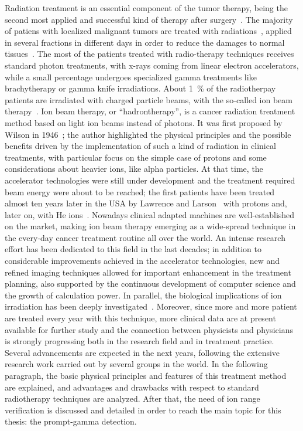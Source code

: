 Radiation treatment is an essential component of the tumor therapy, being the second most applied and successful kind of therapy after surgery~\parencite{Schardt2010}. The majority of patiens with localized malignant tumors are treated with radiations~\parencite{Durante2009, Baskar2012, Moding2013}, applied in several fractions in different days in order to reduce the damages to normal tissues~\parencite{Bentzen2006}. The most of the patients treated with radio-therapy techniques receives standard photon treatments, with x-rays coming from linear electron accelerators, while a small percentage undergoes specialized gamma treatments like brachytherapy or gamma knife irradiations. About 1~\% of the radiotherpay patients are irradiated with charged particle beams, with the so-called ion beam therapy~\parencite{Durante2016}.
Ion beam therapy, or \enquote{hadrontherapy}, is a cancer radiation treatment method based on light ion beams instead of photons. It was first proposed by Wilson in 1946~\parencite{Wilson1946}; the author highlighted the physical principles and the possible benefits driven by the implementation of such a kind of radiation in clinical treatments, with particular focus on the simple case of protons and some considerations about heavier ions, like alpha particles. At that time, the accelerator technologies were still under development and the treatment required beam energy were about to be reached; the first patients have been treated almost ten years later in the USA by Lawrence and Larson~\parencite{Tobias1955, Tobias1958} with protons and, later on, with He ions~\parencite{Halperin2006}. Nowadays clinical adapted machines are well-established on the market, making ion beam therapy emerging as a wide-spread technique in the every-day cancer treatment routine all over the world. An intense research effort has been dedicated to this field in the last decades; in addition to considerable improvements achieved in the accelerator technologies, new and refined imaging techniques allowed for important enhancement in the treatment planning, also supported by the continuous development of computer science and the growth of calculation power. In parallel, the biological implications of ion irradiation has been deeply investigated~\parencite{Tobias1982, Brahme2004, Friedrich2012, }. Moreover, since more and more patient are treated every year with this technique, more clinical data are at present available for further study and the connection between physicists and physicians is strongly progressing both in the research field and in treatment practice. Several advancements are expected in the next years, following the extensive research work carried out by several groups in the world. In the following paragraph, the basic physical principles and features of this treatment method are explained, and advantages and drawbacks with respect to standard radiotherapy techniques are analyzed. After that, the need of ion range verification is discussed and detailed in order to reach the main topic for this thesis: the prompt-gamma detection.   

